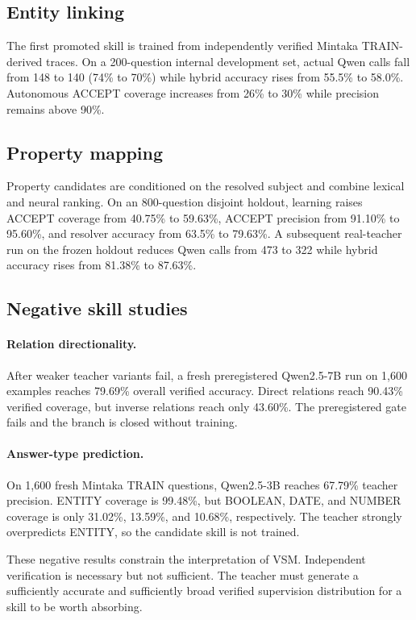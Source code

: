 \documentclass[10pt]{article}
\begin{document}
\subsection{Entity linking}
The first promoted skill is trained from independently verified Mintaka TRAIN-derived traces. On a 200-question internal development set, actual Qwen calls fall from 148 to 140 (74\% to 70\%) while hybrid accuracy rises from 55.5\% to 58.0\%. Autonomous ACCEPT coverage increases from 26\% to 30\% while precision remains above 90\%.

\subsection{Property mapping}
Property candidates are conditioned on the resolved subject and combine lexical and neural ranking. On an 800-question disjoint holdout, learning raises ACCEPT coverage from 40.75\% to 59.63\%, ACCEPT precision from 91.10\% to 95.60\%, and resolver accuracy from 63.5\% to 79.63\%. A subsequent real-teacher run on the frozen holdout reduces Qwen calls from 473 to 322 while hybrid accuracy rises from 81.38\% to 87.63\%.

\subsection{Negative skill studies}
\paragraph{Relation directionality.}
After weaker teacher variants fail, a fresh preregistered Qwen2.5-7B run on 1,600 examples reaches 79.69\% overall verified accuracy. Direct relations reach 90.43\% verified coverage, but inverse relations reach only 43.60\%. The preregistered gate fails and the branch is closed without training.

\paragraph{Answer-type prediction.}
On 1,600 fresh Mintaka TRAIN questions, Qwen2.5-3B reaches 67.79\% teacher precision. ENTITY coverage is 99.48\%, but BOOLEAN, DATE, and NUMBER coverage is only 31.02\%, 13.59\%, and 10.68\%, respectively. The teacher strongly overpredicts ENTITY, so the candidate skill is not trained.

These negative results constrain the interpretation of VSM. Independent verification is necessary but not sufficient. The teacher must generate a sufficiently accurate and sufficiently broad verified supervision distribution for a skill to be worth absorbing.
\end{document}
